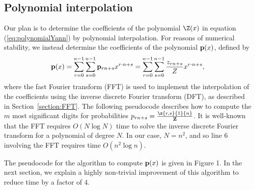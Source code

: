 \subsection{Polynomial interpolation}
Our plan is to determine the coefficients of the polynomial
$\Z(x)$ in equation (\ref{eq:polynomialYann}) by
polynomial interpolation.  For reasons of numerical stability,
we instead determine the coefficients of the polynomial ${\bf p}(x)$,
defined by
\begin{eqnarray}
\label{eq:polynomialYannP}
{\bf p}(x) =
\sum_{r=0}^{n-1} \sum_{s=0}^{n-1}  {\bf p}_{rn+s}
 x^{r\cdot n + s} =
\sum_{r=0}^{n-1} \sum_{s=0}^{n-1}  \frac{z_{rn+s}}{Z}
 x^{r\cdot n + s},
\end{eqnarray}
where the fast Fourier transform (FFT) is used to implement the
interpolation of
the coefficients using the inverse discrete Fourier transform (DFT), as
described in Section~\ref{section:FFT}.  The following pseudocode describes how
to compute the $m$ most significant digits
for probabilities
$p_{rn+s} = \frac{\z{r,s}{1}{n}}{{\bf Z}}$. It is well-known that
the FFT requires $O(N \log N)$ time to solve the inverse discrete
Fourier transform for a polynomial of degree $N$. In our case,
$N=n^2$, and so line 6 involving the FFT requires time $O(n^2 \log n)$.

The pseudocode for the algorithm to compute ${\bf p}(x)$ is given in
Figure 1.
In the next section, we explain a highly non-trivial improvement of
this algorithm to reduce time by a factor of $4$.

